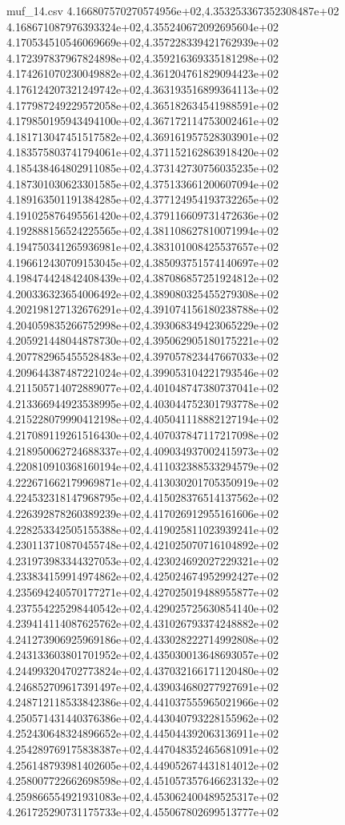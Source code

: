\begin{filecontents*}{muf_14.csv}
4.166807570270574956e+02,4.353253367352308487e+02
4.168671087976393324e+02,4.355240672092695604e+02
4.170534510546069669e+02,4.357228339421762939e+02
4.172397837967824898e+02,4.359216369335181298e+02
4.174261070230049882e+02,4.361204761829094423e+02
4.176124207321249742e+02,4.363193516899364113e+02
4.177987249229572058e+02,4.365182634541988591e+02
4.179850195943494100e+02,4.367172114753002461e+02
4.181713047451517582e+02,4.369161957528303901e+02
4.183575803741794061e+02,4.371152162863918420e+02
4.185438464802911085e+02,4.373142730756035235e+02
4.187301030623301585e+02,4.375133661200607094e+02
4.189163501191384285e+02,4.377124954193732265e+02
4.191025876495561420e+02,4.379116609731472636e+02
4.192888156524225565e+02,4.381108627810071994e+02
4.194750341265936981e+02,4.383101008425537657e+02
4.196612430709153045e+02,4.385093751574140697e+02
4.198474424842408439e+02,4.387086857251924812e+02
4.200336323654006492e+02,4.389080325455279308e+02
4.202198127132676291e+02,4.391074156180238788e+02
4.204059835266752998e+02,4.393068349423065229e+02
4.205921448044878730e+02,4.395062905180175221e+02
4.207782965455528483e+02,4.397057823447667033e+02
4.209644387487221024e+02,4.399053104221793546e+02
4.211505714072889077e+02,4.401048747380737041e+02
4.213366944923538995e+02,4.403044752301793778e+02
4.215228079990412198e+02,4.405041118882127194e+02
4.217089119261516430e+02,4.407037847117217098e+02
4.218950062724688337e+02,4.409034937002415973e+02
4.220810910368160194e+02,4.411032388533294579e+02
4.222671662179969871e+02,4.413030201705350919e+02
4.224532318147968795e+02,4.415028376514137562e+02
4.226392878260389239e+02,4.417026912955161606e+02
4.228253342505155388e+02,4.419025811023939241e+02
4.230113710870455748e+02,4.421025070716104892e+02
4.231973983344327053e+02,4.423024692027229321e+02
4.233834159914974862e+02,4.425024674952992427e+02
4.235694240570177271e+02,4.427025019488955877e+02
4.237554225298440542e+02,4.429025725630854140e+02
4.239414114087625762e+02,4.431026793374248882e+02
4.241273906925969186e+02,4.433028222714992808e+02
4.243133603801701952e+02,4.435030013648693057e+02
4.244993204702773824e+02,4.437032166171120480e+02
4.246852709617391497e+02,4.439034680277927691e+02
4.248712118533842386e+02,4.441037555965021966e+02
4.250571431440376386e+02,4.443040793228155962e+02
4.252430648324896652e+02,4.445044392063136911e+02
4.254289769175838387e+02,4.447048352465681091e+02
4.256148793981402605e+02,4.449052674431814012e+02
4.258007722662698598e+02,4.451057357646623132e+02
4.259866554921931083e+02,4.453062400489525317e+02
4.261725290731175733e+02,4.455067802699513777e+02

\end{filecontents*}
